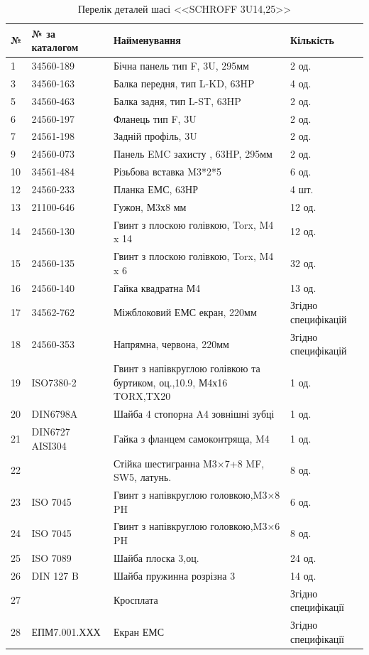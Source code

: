 \begin{table}[H]
    \centering
  \caption{Перелік деталей шасі <<SCHROFF 3U14,25>>}
     \begin{tabular}{|p{0.8cm}|p{3.2cm}|p{7.5cm}|p{2cm}|} 
        \hline
        \textbf{№} & \textbf{№ за каталогом} & \textbf{Найменування} & \textbf{Кількість} \\ \hline
        1 & 34560-189 & Бічна панель тип F, 3U, 295мм  & 2 од. \\ \hline
        3 & 34560-163 & Балка передня, тип L-KD, 63HP & 4 од. \\ \hline
        5 & 34560-463 & Балка задня, тип L-ST, 63HP & 2 од. \\ \hline
        6 & 24560-197 & Фланець тип F, 3U & 2 од. \\ \hline
        7 & 24561-198 & Задній профіль, 3U & 2 од. \\ \hline
        9 & 24560-073 & Панель EMC захисту , 63HP, 295мм & 2 од. \\ \hline
       10 & 34561-484 & Різьбова вставка M3*2*5 & 6 од. \\ \hline
       12 & 24560-233 & Планка ЕМС, 63НР & 4 шт. \\ \hline
       13 & 21100-646 & Гужон, М3х8 мм & 12 од. \\ \hline
       14 & 24560-130 & Гвинт з плоскою голівкою, Torx, M4 x 14 & 12 од. \\ \hline
       15 & 24560-135 & Гвинт з плоскою голівкою, Torx, M4 x 6 & 32 од. \\ \hline
       16 & 24560-140 & Гайка квадратна М4 & 13 од. \\ \hline
       17 & 34562-762 & Міжблоковий ЕМС екран, 220мм & Згідно специфікацій \\ \hline
       18 & 24560-353 & Напрямна, червона, 220мм & Згідно специфікацій \\ \hline
       19 & ISO7380-2 & Гвинт з напівкруглою голівкою та буртиком, оц.,10.9, М4х16 TORX,TX20 & 1 од. \\ \hline
       20 & DIN6798A & Шайба 4 стопорна A4 зовнішні зубці & 1 од. \\ \hline
       21 & DIN6727 AISI304 & Гайка з фланцем самоконтряща, M4 & 1 од. \\ \hline
       22 &  & Стійка шестигранна M3×7+8 MF, SW5, латунь. & 8 од. \\ \hline
       23 & ISO 7045 & Гвинт з напівкруглою головкою,M3×8 PH & 6 од. \\ \hline
       24 & ISO 7045 & Гвинт з напівкруглою головкою,M3×6 PH & 8 од. \\ \hline
       25 & ISO 7089 & Шайба плоска 3,оц. & 24 од. \\ \hline
       26 & DIN 127 B & Шайба пружинна розрізна 3 & 14 од. \\ \hline
       27 &  & Кросплата & Згідно специфікації \\ \hline
       28 & ЕПМ7.001.ХХХ & Екран ЕМС & Згідно специфікації \\ \hline
    \end{tabular}    
\end{table}
